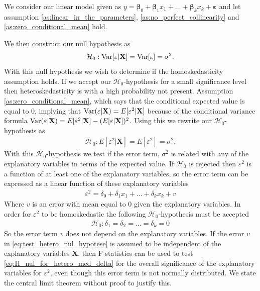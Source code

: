 We consider our linear model given as $y = \mathbf{\beta}_0 + \mathbf{\beta}_1x_1 + \ldots + \mathbf{\beta}_kx_k + \mathbf{\varepsilon}$ and let assumption \ref{as:linear_in_the_parameters}, \ref{as:no_perfect_collinearity} and \ref{as:zero_conditional_mean} hold.

We then construct our null hypothesis as
\begin{align*}
    \mathcal{H}_0 : \operatorname{\text{Var}}[\varepsilon | \mathbf{X}] = \operatorname{\text{Var}}[\varepsilon] = \sigma^2. 
\end{align*}
With this null hypothesis we wish to determine if the homoskedasticity assumption holds. 
If we accept our $\mathcal{H}_0$-hypothesis for a small significance level then heteroskedasticity is with a high probability not present.
Assumption \ref{as:zero_conditional_mean}, which says that the conditional expected value is equal to $0$, implying that $\operatorname{\text{Var}}(\varepsilon | \mathbf{X}) = E[\varepsilon^2 | \mathbf{X}]$ because of the conditional variance formula $\operatorname{\text{Var}}(\varepsilon | \mathbf{X}) = E[\varepsilon^2 | \mathbf{X}] - (E[\varepsilon | \mathbf{X}])^2$. Using this we rewrite our $\mathcal{H}_0$-hypothesis as
\begin{align*}
    \mathcal{H}_0 : E[\varepsilon^2 | \mathbf{X}] = E[\varepsilon^2] = \sigma^2.
\end{align*}
With this $\mathcal{H}_0$-hypothesis we test if the error term, $\sigma^2$ is related with any of the explanatory variables in terms of the expected value.  
If $\mathcal{H}_0$ is rejected then $\varepsilon^2$ is a function of at least one of the explanatory variables, so the error term can be expressed as a linear function of these explanatory variables
\begin{align}\label{eq:test_hetero_nul_hypotese}
    \varepsilon^2 = \delta_0 + \delta_1x_1 + \ldots + \delta_kx_k + v
\end{align}
Where $v$ is an error with mean equal to $0$ given the explanatory variables. In order for $\varepsilon^2$ to be homoskedastic the following $\mathcal{H}_0$-hypothesis must be accepted 
\begin{align}\label{eq:H_nul_for_hetero_med_delta}
    \mathcal{H}_0 : \delta_1 = \delta_2 = \ldots = \delta_k = 0
\end{align}
So the error term $v$ does not depend on the explanatory variables. If the error $v$ in \eqref{eq:test_hetero_nul_hypotese} is assumed to be independent of the explanatory variables $\mathbf{X}$, then F-statistics can be used to test \eqref{eq:H_nul_for_hetero_med_delta} for the overall significance of the explanatory variables for $\varepsilon^2$, even though this error term is not normally distributed. We state the central limit theorem without proof to justify this. 
